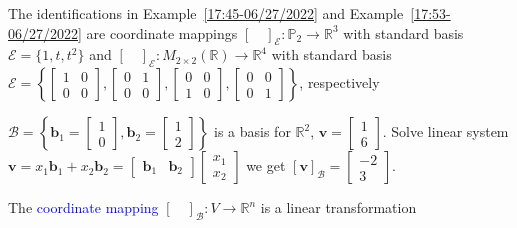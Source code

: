 \documentclass{beamer}
\theoremstyle{definition}
\theoremstyle{remark}
\begin{document}
\begin{frame}[t]
\begin{example}
The identifications in Example~\ref{17:45-06/27/2022} and Example~\ref{17:53-06/27/2022} are coordinate mappings $[\quad]_{\mathcal E}:\mathbb P_2\to\mathbb R^3$ with standard basis $\mathcal E=\{1,t,t^2\}$ and $[\quad]_{\mathcal E}:M_{2\times2}(\mathbb R)\to\mathbb R^4$ with standard basis $\mathcal E=\left\{\begin{bmatrix}
1&0\\0&0
\end{bmatrix},\begin{bmatrix}
0&1\\0&0
\end{bmatrix},\begin{bmatrix}
0&0\\1&0
\end{bmatrix},\begin{bmatrix}
0&0\\0&1
\end{bmatrix}\right\}$, respectively
\end{example}
\pause
\begin{example}
$\mathcal B=\left\{\mathbf b_1=\begin{bmatrix}
1\\0
\end{bmatrix}, \mathbf b_2=\begin{bmatrix}
1\\2
\end{bmatrix}\right\}$ is a basis for $\mathbb R^2$, $\mathbf v=\begin{bmatrix}
1\\6
\end{bmatrix}$. Solve linear system $\mathbf v=x_1\mathbf b_1+x_2\mathbf b_2=\begin{bmatrix}
\mathbf b_1&\mathbf b_2
\end{bmatrix}\begin{bmatrix}
x_1\\x_2
\end{bmatrix}$ we get $[\mathbf v]_{\mathcal B}=\begin{bmatrix}
-2\\3
\end{bmatrix}$.
\end{example}
\pause
\begin{theorem}
The \textcolor{blue}{coordinate mapping} $[\quad]_{\mathcal B}:V\to\mathbb R^n$ is a linear transformation
\end{theorem}
\end{frame}
\end{document}
